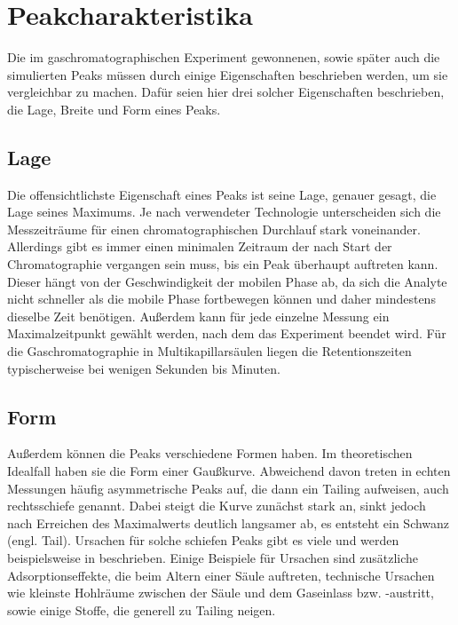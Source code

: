 \section{Peakcharakteristika}
Die im gaschromatographischen Experiment gewonnenen, sowie später auch die simulierten Peaks müssen durch einige Eigenschaften beschrieben werden, um sie vergleichbar zu machen. Dafür seien hier drei solcher Eigenschaften beschrieben, die Lage, Breite und Form eines Peaks.


\subsection{Lage}
Die offensichtlichste Eigenschaft eines Peaks ist seine Lage, genauer gesagt, die Lage seines Maximums. Je nach verwendeter Technologie unterscheiden sich die Messzeiträume für einen chromatographischen Durchlauf stark voneinander. %
Allerdings gibt es immer einen minimalen Zeitraum der nach Start der Chromatographie vergangen sein muss, bis ein Peak überhaupt auftreten kann. Dieser hängt von der Geschwindigkeit der mobilen Phase ab, da sich die Analyte nicht schneller als die mobile Phase fortbewegen können und daher mindestens dieselbe Zeit benötigen. Außerdem kann für jede einzelne Messung ein Maximalzeitpunkt gewählt werden, nach dem das Experiment beendet wird.
Für die Gaschromatographie in Multikapillarsäulen liegen die Retentionszeiten typischerweise bei wenigen Sekunden bis Minuten.

\subsection{Form}
Außerdem können die Peaks verschiedene Formen haben. Im theoretischen Idealfall haben sie die Form einer Gaußkurve. %
Abweichend davon treten in echten Messungen häufig asymmetrische Peaks auf, die dann ein Tailing aufweisen, auch rechtsschiefe genannt. Dabei steigt die Kurve zunächst stark an, sinkt jedoch nach Erreichen des Maximalwerts deutlich langsamer ab, es entsteht ein Schwanz (engl. Tail).
Ursachen für solche schiefen Peaks gibt es viele und werden beispielsweise in \cite{kolb2003, Moretti2004, Giddings1963} beschrieben. Einige Beispiele für Ursachen sind zusätzliche Adsorptionseffekte, die beim Altern einer Säule auftreten, technische Ursachen wie kleinste Hohlräume zwischen der Säule und dem Gaseinlass bzw. -austritt, sowie einige Stoffe, die generell zu Tailing neigen. %

